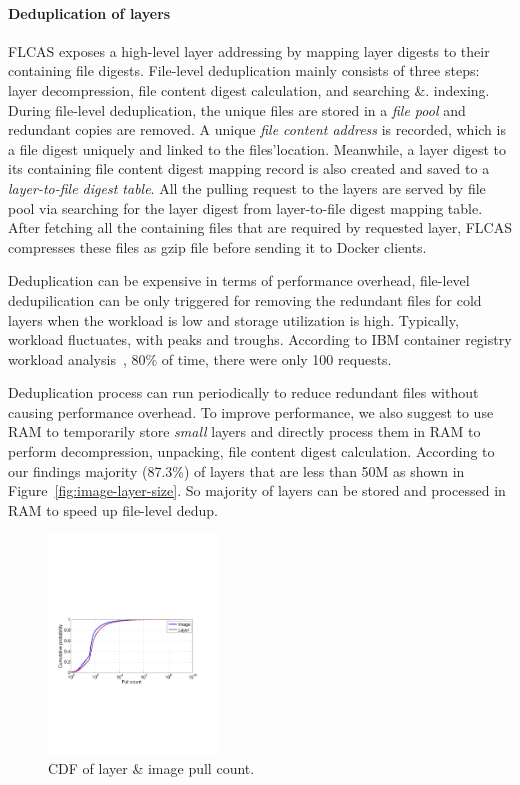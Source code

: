 \paragraph{Deduplication of layers}
FLCAS exposes a high-level layer addressing by mapping layer digests to their
containing file digests. File-level deduplication mainly consists of three
steps: layer decompression, file content digest calculation, and searching \&.
indexing.  During file-level deduplication, the unique files are stored in a
\textit{file pool} and redundant copies are removed. A unique \textit{file
content address} is recorded, which is a file digest uniquely and linked to the
files'location. Meanwhile, a layer digest to its containing file content digest
mapping record is also created and saved to a \textit{layer-to-file digest
table}.  All the pulling request to the layers are served by file pool via
searching for the layer digest from layer-to-file digest mapping table. After
fetching all the containing files that are required by requested layer, FLCAS
compresses these files as gzip file before sending it to Docker clients.         

Deduplication can be expensive in terms of performance overhead, file-level
dedupilication can be only triggered for removing the redundant files for cold
layers when the workload is low and storage utilization is high.  Typically,
workload fluctuates, with peaks and troughs. According to IBM container
registry workload analysis~\cite{xxx}, 80\% of time, there were only 100
requests.

Deduplication process can run periodically to reduce redundant files without
causing performance overhead.  To improve performance, we also suggest to use
RAM to temporarily store \textit{small} layers and directly process them in RAM
to perform decompression, unpacking, file content digest calculation.
According to our findings majority (87.3\%) of layers that are less than 50M as
shown in Figure~\ref{fig:image-layer-size}. So majority of layers can be stored
and processed in RAM to speed up file-level dedup. 

\begin{figure}
	\centering
	\includegraphics[width=0.4\textwidth]{graphs/pull-cnt.pdf}
	\caption{CDF of layer \& image pull count.
	}
	\label{fig:pull-cnt}
\end{figure}

